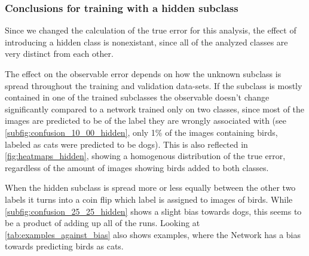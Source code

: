 \documentclass[a4paper,11pt]{scrartcl}
\theoremstyle{definition}
\begin{document}
\subsubsection{Conclusions for training with a hidden subclass}
Since we changed the calculation of the true error for this analysis, the effect of introducing a hidden class is nonexistant, since all of the analyzed classes are very distinct from each other.

The effect on the observable error depends on how the unknown subclass is spread throughout the training and validation data-sets.
If the subclass is mostly contained in one of the trained subclasses the observable doesn't change significantly compared to a network trained only on two classes, since most of the images are predicted to be of the label they are wrongly associated with (see \autoref{subfig:confusion_10_00_hidden}, only 1\% of the images containing birds, labeled as cats were predicted to be dogs).
This is also reflected in \autoref{fig:heatmaps_hidden}, showing a homogenous distribution of the true error, regardless of the amount of images showing birds added to both classes.

When the hidden subclass is spread more or less equally between the other two labels it turns into a coin flip which label is assigned to images of birds.
While \autoref{subfig:confusion_25_25_hidden} shows a slight bias towards dogs, this seems to be a product of adding up all of the runs. Looking at \autoref{tab:examples_against_bias} also shows examples, where the Network has a bias towards predicting birds as cats.
\end{document}
